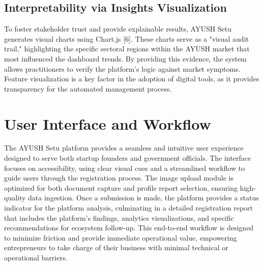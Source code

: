 \documentclass[conference]{IEEEtran}
\begin{document}
\subsection{Interpretability via Insights Visualization}
To foster stakeholder trust and provide explainable results, AYUSH Setu generates visual charts using Chart.js [6]. These charts serve as a "visual audit trail," highlighting the specific sectoral regions within the AYUSH market that most influenced the dashboard trends. By providing this evidence, the system allows practitioners to verify the platform's logic against market symptoms. Feature visualization is a key factor in the adoption of digital tools, as it provides transparency for the automated management process.


\section{User Interface and Workflow}
The AYUSH Setu platform provides a seamless and intuitive user experience designed to serve both startup founders and government officials. The interface focuses on accessibility, using clear visual cues and a streamlined workflow to guide users through the registration process. The image upload module is optimized for both document capture and profile report selection, ensuring high-quality data ingestion. Once a submission is made, the platform provides a status indicator for the platform analysis, culminating in a detailed registration report that includes the platform's findings, analytics visualizations, and specific recommendations for ecosystem follow-up. This end-to-end workflow is designed to minimize friction and provide immediate operational value, empowering entrepreneurs to take charge of their business with minimal technical or operational barriers.
\end{document}
